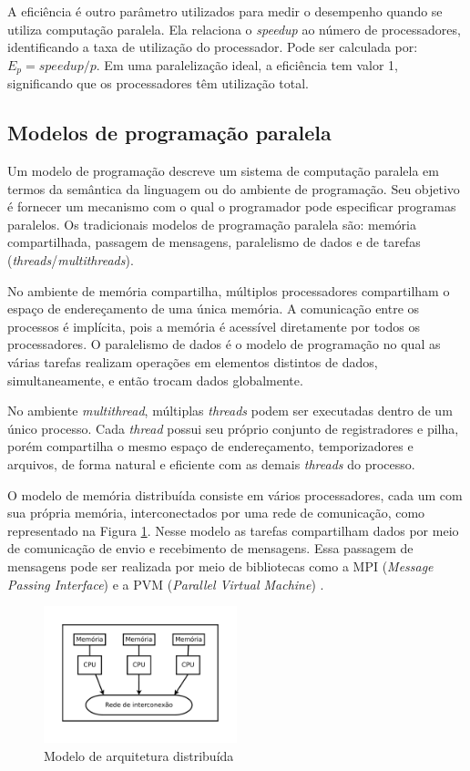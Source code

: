A eficiência é outro parâmetro utilizados para medir o desempenho quando se utiliza computação paralela. Ela relaciona o \textit{speedup} ao número de processadores, identificando a taxa de utilização do processador. Pode ser calculada por: $E_p = speedup/p$. Em uma paralelização ideal, a eficiência tem valor 1, significando que os processadores têm utilização total.

\subsection{Modelos de programação paralela}

Um modelo de programação descreve um sistema de computação paralela em termos da semântica da linguagem ou do ambiente de programação. Seu objetivo é fornecer um mecanismo com o qual o programador pode especificar programas paralelos. Os tradicionais modelos de programação paralela são: memória compartilhada, passagem de mensagens, paralelismo de dados e de tarefas (\textit{threads}/\textit{multithreads}). 

No ambiente de memória compartilha, múltiplos processadores compartilham o espaço de endereçamento de uma única memória. A comunicação entre os processos é implícita, pois a memória é acessível diretamente por todos os processadores. O paralelismo de dados é o modelo de programação no qual as várias tarefas realizam operações em elementos distintos de dados, simultaneamente, e então trocam dados globalmente.

No ambiente \textit{multithread}, múltiplas \textit{threads} podem ser executadas dentro de um único processo. Cada \textit{thread} possui seu próprio conjunto de registradores e pilha, porém compartilha o mesmo espaço de endereçamento, temporizadores e arquivos, de forma natural e eficiente com as demais \textit{threads} do processo. 

O modelo de memória distribuída consiste em vários processadores, cada um com sua própria memória, interconectados por uma rede de comunicação, como representado na Figura \ref{fig:ArquiteturaDistribuida}.
Nesse modelo as tarefas compartilham dados por meio de comunicação de envio e recebimento de mensagens. Essa passagem de mensagens pode ser realizada por meio de bibliotecas como a MPI (\textit{Message Passing Interface}) e a PVM (\textit{Parallel Virtual Machine}) \cite{Rauber:2010}. 

\begin{figure}[htb]
\centering
\includegraphics[trim=0cm 1cm 0cm 0cm, width=0.5\textwidth]{figuras/Arquitetura.pdf}
\caption{Modelo de arquitetura distribuída}
\label{fig:ArquiteturaDistribuida}
\end{figure}

